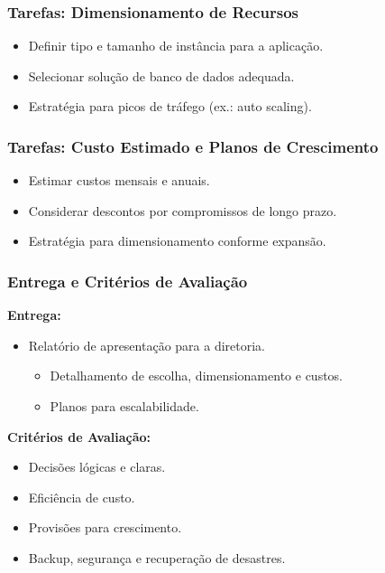 \documentclass{beamer}
\begin{document}
      \begin{frame}
      \frametitle{Tarefas: Dimensionamento de Recursos}
      \begin{itemize}
          \item Definir tipo e tamanho de instância para a aplicação.
          \item Selecionar solução de banco de dados adequada.
          \item Estratégia para picos de tráfego (ex.: auto scaling).
      \end{itemize}
      \end{frame}
      
      \begin{frame}
      \frametitle{Tarefas: Custo Estimado e Planos de Crescimento}
      \begin{itemize}
          \item Estimar custos mensais e anuais.
          \item Considerar descontos por compromissos de longo prazo.
          \item Estratégia para dimensionamento conforme expansão.
      \end{itemize}
      \end{frame}
      
      \begin{frame}
      \frametitle{Entrega e Critérios de Avaliação}
      \textbf{Entrega:}
      \begin{itemize}
          \item Relatório de apresentação para a diretoria.
          \begin{itemize}
            \item Detalhamento de escolha, dimensionamento e custos.
            \item Planos para escalabilidade.
          \end{itemize}
          
      \end{itemize}
      \textbf{Critérios de Avaliação:}
      \begin{itemize}
          \item Decisões lógicas e claras.
          \item Eficiência de custo.
          \item Provisões para crescimento.
          \item Backup, segurança e recuperação de desastres.
      \end{itemize}
      \end{frame}
      
\end{document}
